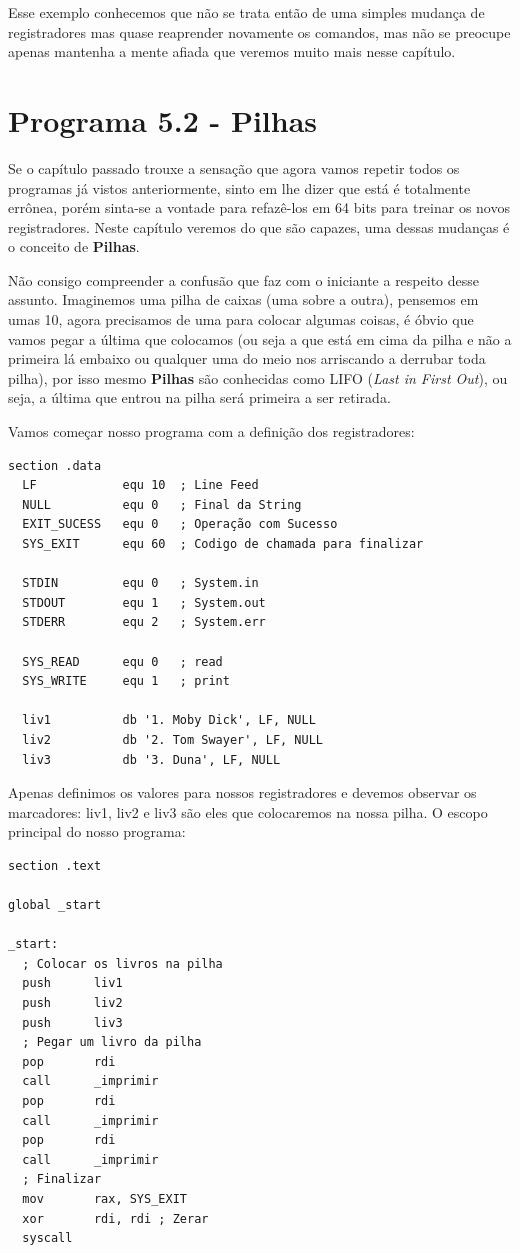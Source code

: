 Esse exemplo conhecemos que não se trata então de uma simples mudança de registradores mas quase reaprender novamente os comandos, mas não se preocupe apenas mantenha a mente afiada que veremos muito mais nesse capítulo.

\section{Programa 5.2 - Pilhas}
Se o capítulo passado trouxe a sensação que agora vamos repetir todos os programas já vistos anteriormente, sinto em lhe dizer que está é totalmente errônea, porém sinta-se a vontade para refazê-los em 64 bits para treinar os novos registradores. Neste capítulo veremos do que são capazes, uma dessas mudanças é o conceito de \textbf{Pilhas}.

Não consigo compreender a confusão que faz com o iniciante a respeito desse assunto. Imaginemos uma pilha de caixas (uma sobre a outra), pensemos em umas 10, agora precisamos de uma para colocar algumas coisas, é óbvio que vamos pegar a última que colocamos (ou seja a que está em cima da pilha e não a primeira lá embaixo ou qualquer uma do meio nos arriscando a derrubar toda pilha), por isso mesmo \textbf{Pilhas} são conhecidas como LIFO (\textit{Last in First Out}), ou seja, a última que entrou na pilha será primeira a ser retirada.

Vamos começar nosso programa com a definição dos registradores:
\begin{lstlisting}[]
section .data
  LF            equ 10  ; Line Feed
  NULL          equ 0   ; Final da String
  EXIT_SUCESS   equ 0   ; Operação com Sucesso
  SYS_EXIT      equ 60  ; Codigo de chamada para finalizar

  STDIN         equ 0   ; System.in
  STDOUT        equ 1   ; System.out
  STDERR        equ 2   ; System.err

  SYS_READ      equ 0   ; read
  SYS_WRITE     equ 1   ; print

  liv1          db '1. Moby Dick', LF, NULL
  liv2          db '2. Tom Swayer', LF, NULL  
  liv3          db '3. Duna', LF, NULL
\end{lstlisting}

Apenas definimos os valores para nossos registradores e devemos observar os marcadores: liv1, liv2 e liv3 são eles que colocaremos na nossa pilha. O escopo principal do nosso programa:
\begin{lstlisting}[]
section .text

global _start

_start:
  ; Colocar os livros na pilha
  push      liv1
  push      liv2
  push      liv3
  ; Pegar um livro da pilha
  pop       rdi
  call      _imprimir
  pop       rdi
  call      _imprimir
  pop       rdi
  call      _imprimir
  ; Finalizar
  mov       rax, SYS_EXIT
  xor 		rdi, rdi ; Zerar
  syscall
\end{lstlisting}

